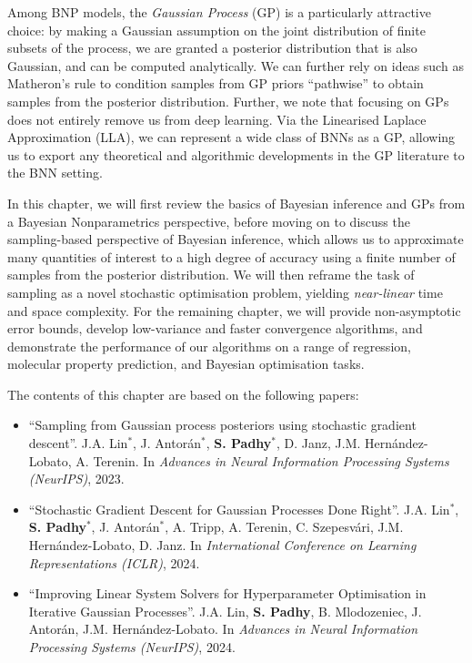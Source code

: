 Among BNP models, the \textit{Gaussian Process} (GP) is a particularly attractive choice: by making a Gaussian assumption on the joint distribution of finite subsets of the process, we are granted a posterior distribution that is also Gaussian, and can be computed analytically. We can further rely on ideas such as Matheron's rule to condition samples from GP priors ``pathwise'' to obtain samples from the posterior distribution. Further, we note that focusing on GPs does not entirely remove us from deep learning. Via the Linearised Laplace Approximation (LLA), we can represent a wide class of BNNs as a GP, allowing us to export any theoretical and algorithmic developments in the GP literature to the BNN setting.

In this chapter, we will first review the basics of Bayesian inference and GPs from a Bayesian Nonparametrics perspective, before moving on to discuss the sampling-based perspective of Bayesian inference, which allows us to approximate many quantities of interest to a high degree of accuracy using a finite number of samples from the posterior distribution. We will then reframe the task of sampling as a novel stochastic optimisation problem, yielding \textit{near-linear} time and space complexity. For the remaining chapter, we will provide non-asymptotic error bounds, develop low-variance and faster convergence algorithms, and demonstrate the performance of our algorithms on a range of regression, molecular property prediction, and Bayesian optimisation tasks.

The contents of this chapter are based on the following papers:
\begin{itemize}
    \item ``Sampling from Gaussian process posteriors using stochastic gradient descent''. J.A. Lin$^{*}$, J. Antorán$^{*}$, \textbf{S. Padhy}$^{*}$, D. Janz, J.M. Hernández-Lobato, A. Terenin. In \textit{Advances in Neural Information Processing Systems (NeurIPS)}, 2023.
    \item ``Stochastic Gradient Descent for Gaussian Processes Done Right''. J.A. Lin$^{*}$, \textbf{S. Padhy}$^{*}$, J. Antorán$^{*}$, A. Tripp, A. Terenin, C. Szepesvári, J.M. Hernández-Lobato, D. Janz. In \textit{International Conference on Learning Representations (ICLR)}, 2024.
    \item ``Improving Linear System Solvers for Hyperparameter Optimisation in Iterative Gaussian Processes''. J.A. Lin, \textbf{S. Padhy}, B. Mlodozeniec, J. Antorán, J.M. Hernández-Lobato. In \textit{Advances in Neural Information Processing Systems (NeurIPS)}, 2024.
\end{itemize}

